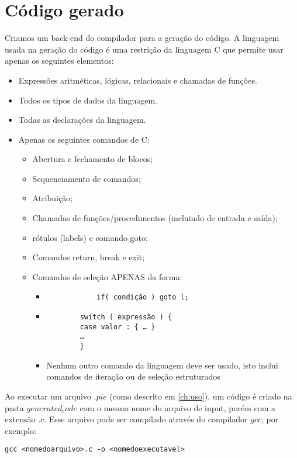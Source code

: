 \section{Código gerado}
Criamos um back-end do compilador para a geração do código. 
A linguagem usada na geração do código é uma restrição da linguagem C que permite usar apenas os seguintes elementos:
\begin{itemize}
	\item Expressões aritméticas, lógicas, relacionais e chamadas de funções.
	\item Todos os tipos de dados da linguagem.
	\item Todas as declarações da linguagem.
	\item Apenas os seguintes comandos de C:
	\begin{itemize}
		\item Abertura e fechamento de blocos;
		\item Sequenciamento de comandos;
		\item Atribuição;
		\item Chamadas de funções/procedimentos (incluindo de entrada e saída);
		\item rótulos (labels) e comando goto;
		\item Comandos return, break e exit;
		\item Comandos de seleção APENAS da forma:
		\begin{itemize}
			\item \begin{verbatim}
			if( condição ) goto l;
			\end{verbatim}
			\item \begin{verbatim}
		switch ( expressão ) {
		case valor : { … }
		…
		}
		\end{verbatim}
		\item Nenhum outro comando da linguagem deve ser usado, isto inclui comandos de iteração ou de
		seleção estruturados	
		\end{itemize}
	\end{itemize}
\end{itemize}

Ao executar um arquivo $.pie$ (como descrito em \ref{ch:uso}), um código é criado na pasta $generated_code$ com o mesmo nome do arquivo de input, porém com a extensão $.c$. Esse arquivo pode ser compilado através do compilador $gcc$, por exemplo:
\begin{verbatim}
gcc <nomedoarquivo>.c -o <nomedoexecutavel>
\end{verbatim}

